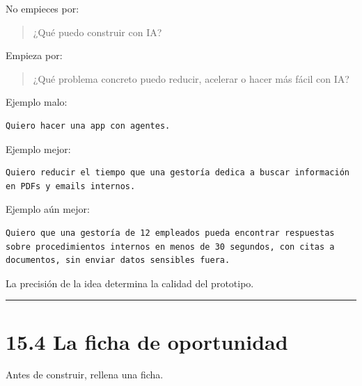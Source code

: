 No empieces por:

\begin{quote}
¿Qué puedo construir con IA?
\end{quote}

Empieza por:

\begin{quote}
¿Qué problema concreto puedo reducir, acelerar o hacer más fácil con IA?
\end{quote}

Ejemplo malo:

\begin{lstlisting}
Quiero hacer una app con agentes.
\end{lstlisting}

Ejemplo mejor:

\begin{lstlisting}
Quiero reducir el tiempo que una gestoría dedica a buscar información en PDFs y emails internos.
\end{lstlisting}

Ejemplo aún mejor:

\begin{lstlisting}
Quiero que una gestoría de 12 empleados pueda encontrar respuestas sobre procedimientos internos en menos de 30 segundos, con citas a documentos, sin enviar datos sensibles fuera.
\end{lstlisting}

La precisión de la idea determina la calidad del prototipo.

\begin{center}\rule{0.5\linewidth}{0.5pt}\end{center}

\section{15.4 La ficha de oportunidad}\label{la-ficha-de-oportunidad}

Antes de construir, rellena una ficha.

